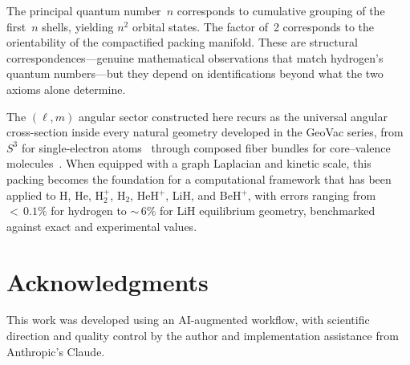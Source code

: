 \documentclass[aps,prl,reprint,amsmath,amssymb]{revtex4-2}
\begin{document}
The principal quantum number~$n$ corresponds to cumulative grouping of
the first~$n$ shells, yielding $n^2$ orbital states.  The factor of~2
corresponds to the orientability of the compactified packing manifold.
These are structural correspondences---genuine mathematical
observations that match hydrogen's quantum numbers---but they depend
on identifications beyond what the two axioms alone determine.

The $(\ell, m)$ angular sector constructed here recurs as the
universal angular cross-section inside every natural geometry developed
in the GeoVac series, from $S^3$ for single-electron
atoms~\cite{paper7} through composed fiber bundles for core--valence
molecules~\cite{paper17}.  When equipped with a graph Laplacian and
kinetic scale, this packing becomes the foundation for a computational
framework that has been applied to H, He, H$_2^+$, H$_2$, HeH$^+$,
LiH, and BeH$^+$, with errors ranging from ${<}\,0.1\%$ for hydrogen
to ${\sim}\,6\%$ for LiH equilibrium geometry, benchmarked against
exact and experimental values.


\section*{Acknowledgments}

This work was developed using an AI-augmented workflow, with
scientific direction and quality control by the author and
implementation assistance from Anthropic's Claude.
\end{document}
